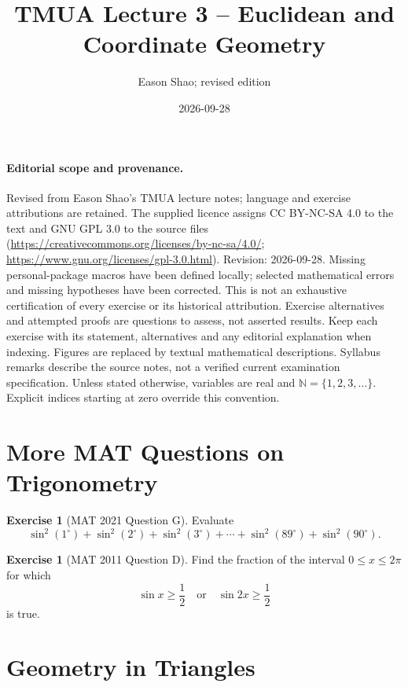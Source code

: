 \documentclass[11pt]{article}
\title{TMUA Lecture 3 -- Euclidean and Coordinate Geometry}
\author{Eason Shao; revised edition}
\date{2026-09-28}
\theoremstyle{definition}
\newtheorem{example}[theorem]{Exercise}
\theoremstyle{remark}
\newcommand{\pqty}[1]{\left(#1\right)}
\newcommand{\NN}{\mathbb{N}}
\newcommand{\degree}{^{\circ}}
\newcommand{\qor}{\quad\text{or}\quad}
\begin{document}
\maketitle
\paragraph{Editorial scope and provenance.}
Revised from Eason Shao's TMUA lecture notes; language and exercise attributions are retained.
The supplied licence assigns CC BY-NC-SA 4.0 to the text and GNU GPL 3.0 to the source files
(\url{https://creativecommons.org/licenses/by-nc-sa/4.0/};
\url{https://www.gnu.org/licenses/gpl-3.0.html}).
Revision: 2026-09-28. Missing personal-package macros have been defined locally;
selected mathematical errors and missing hypotheses have been corrected.
This is not an exhaustive certification of every exercise or its historical attribution.
Exercise alternatives and attempted proofs are questions to assess, not asserted results.
Keep each exercise with its statement, alternatives and any editorial explanation when indexing.
Figures are replaced by textual mathematical descriptions. Syllabus remarks describe the
source notes, not a verified current examination specification.
Unless stated otherwise, variables are real and \(\NN=\{1,2,3,\ldots\}\).
Explicit indices starting at zero override this convention.

\tableofcontents


\section*{More MAT Questions on Trigonometry}\label{tmua-3-section-001}

\begin{example}[MAT 2021 Question G]\label{tmua-3-unit-001}
    Evaluate
    \[
        \sin^2 \pqty{1 \degree} + \sin^2 \pqty{2 \degree} + \sin^2 \pqty{3 \degree} + \cdots + \sin^2 \pqty{89 \degree} + \sin^2 \pqty{90 \degree}.
    \]
\end{example}

\begin{example}[MAT 2011 Question D]\label{tmua-3-unit-002}
    Find the fraction of the interval \(0 \leq x \leq 2 \pi\) for which
    \[
        \sin x \geq \frac{1}{2} \qor \sin 2x \geq \frac{1}{2}
    \]
    is true.
\end{example}

\section{Geometry in Triangles}\label{tmua-3-section-002}
\end{document}
